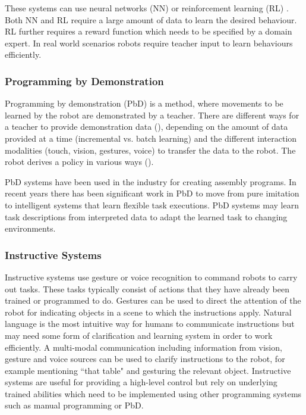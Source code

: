 These systems can use neural networks (NN) \cite{billard2001robust} or reinforcement learning (RL)  \cite{smart2002effective}. Both NN and RL require a large amount of data to learn the desired behaviour. RL further requires a reward function which needs to be specified by a domain expert.
In real world scenarios robots require teacher input to learn behaviours efficiently. 

\subsubsection{Programming by Demonstration}
Programming by demonstration (PbD) \cite{billard2008robot} is a method, where movements to be learned by the robot are demonstrated by a teacher. There are different ways for a teacher to provide demonstration data (), depending on the amount of data provided at a time (incremental vs. batch learning) and the different interaction modalities (touch, vision, gestures, voice) to transfer the data to the robot. The robot derives a policy in various ways (). 

PbD systems have been used in the industry for creating assembly programs. In recent years there has been significant work in PbD to move from pure imitation to intelligent systems that learn flexible task executions. PbD systems may learn task descriptions from interpreted data to adapt the learned task to changing environments.

\subsubsection{Instructive Systems}
Instructive systems use gesture or voice recognition to command robots to carry out tasks. These tasks typically consist of actions that they have already been trained or programmed to do. Gestures can be used to direct the attention of the robot for indicating objects in a scene to which the instructions apply. Natural language is the most intuitive way for humans to communicate instructions but may need some form of clarification and learning system in order to work efficiently. 
A multi-modal communication including information from vision, gesture and voice sources can be used to clarify instructions to the robot, for example mentioning ``that table" and gesturing the relevant object.
Instructive systems are useful for providing a high-level control but rely on underlying trained abilities which need to be implemented using other programming systems such as manual programming or PbD.

